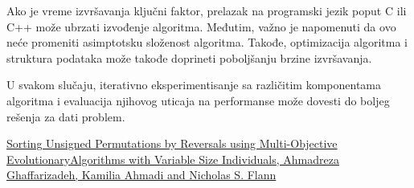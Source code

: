 \documentclass{article}
\begin{document}
Ako je vreme izvršavanja ključni faktor, prelazak na programski jezik poput C ili C++ može ubrzati izvođenje algoritma. Međutim, važno je napomenuti da ovo neće promeniti asimptotsku složenost algoritma. Takođe, optimizacija algoritma i struktura podataka može takođe doprineti poboljšanju brzine izvršavanja.
\newline

U svakom slučaju, iterativno eksperimentisanje sa različitim komponentama algoritma i evaluacija njihovog uticaja na performanse može dovesti do boljeg rešenja za dati problem.

\newpage

		\appendix
		
		\iffalse
		 
		
		\fi
		
		\begin{thebibliography}{9}
			
                \href{https://www.researchgate.net/publication/221009015_Sorting_unsigned_permutations_by_reversals
_using_multi-objective_evolutionary_algorithms_with_variable_size_}{Sorting Unsigned Permutations by Reversals using Multi-Objective EvolutionaryAlgorithms 
with Variable Size Individuals, Ahmadreza Ghaffarizadeh, Kamilia Ahmadi and Nicholas S. Flann}
			
		
			
                

               
                
		\end{thebibliography}
\end{document}
